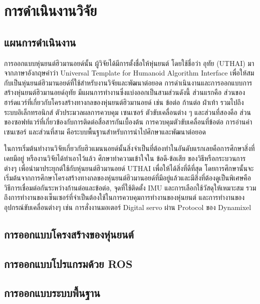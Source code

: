 \chapter{การดำเนินงานวิจัย}
\section{แผนการดำเนินงาน}
การออกแบบหุ่นยนต์ฮิวมานอยด์นั้น ผู้วิจัยได้มีการตั้งชื่อให้หุ่นยนต์ โดยใช้ชื่อว่า อุทัย (UTHAI)
มาจากภาษาอังกฤษคำว่า Universal Template for Humanoid Algorithm Interface
เพื่อให้สมกับเป็นหุ่นยนต์ฮิวมานอยด์ที่ใช้สำหรับงานวิจัยและพัฒนาต่อยอด
การดำเนินงานและการออกแบบการสร้างหุ่นยนต์ฮิวมานอยด์อุทัย มีแผนการทำงานซึ่งแบ่งออกเป็นสามส่วนดังนี้
ส่วนแรกคือ ส่วนของฮาร์ดแวร์ที่เกี่ยวกับโครงสร้างทางกลของหุ่นยนต์ฮิวมานอยด์ เช่น ข้อต่อ ก้านต่อ ฝ่าเท้า
รวมไปถึงระบบอิเล็กทรอนิกส์ ตัวประมวลผลการควบคุม เซนเซอร์ ตัวขับเคลื่อนต่าง ๆ และส่วนที่สองคือ
ส่วนของซอฟท์แวร์ที่เกี่ยวข้องกับการติดต่อสื่อสารกันเบื้องต้น การควบคุมตัวขับเคลื่อนที่ข้อต่อ การอ่านค่าเซนเซอร์
และส่วนที่สาม คือระบบพื้นฐานสำหรับการนำไปศึกษาและพัฒนาต่อยอด

ในการเริ่มต้นทำงานวิจัยเกี่ยวกับฮิวแมนนอยด์นั้นสิ่งจำเป็นที่ต้องทำในอันดับแรกเลยคือการศึกษาสิ่งที่เคยมีอยู่ หรืองานวิจัยได้ทำเอาไว้แล้ว
ศึกษาทำความเข้าใจใน ข้อดี-ข้อเสีย ของวิธีหรือกระบวนการต่างๆ เพื่อนำมาประยุกต์ใช้กับหุ่นยนต์ฮิวมานอยด์ UTHAI เพื่อให้ได้สิ่งที่ดีที่สุด
โดยการศึกษานั้นจะเริ่มต้นจากการศึกษาโครงสร้างทางกลของหุ่นยนต์ฮิวมานอยด์ที่มีอยู่แล้วและมีสิ่งที่ต้องดูเป็นพิเศษคือ
วิธีการเชื่อมต่อกันระหว่างก้านต่อและข้อต่อ, จุดที่ใช้ติดตั้ง IMU และการเลือกใช้วัสดุให้เหมาะสม
รวมถึงการทำงานของเซ็นเซอร์ที่จำเป็นต้องใช้ในการควบคุมการทำงานของหุ่นยนต์ และการทำงานของอุปกรณ์ขับเคลื่อนต่างๆ
เช่น การสั่งงานมอเตอร์ Digital servo ผ่าน Protocol ของ Dynamixel

\clearpage
\section{การออกแบบโครงสร้างของหุ่นยนต์}


\clearpage
\section{การออกแบบโปรแกรมด้วย ROS}


\clearpage
\section{การออกแบบระบบพื้นฐาน}

